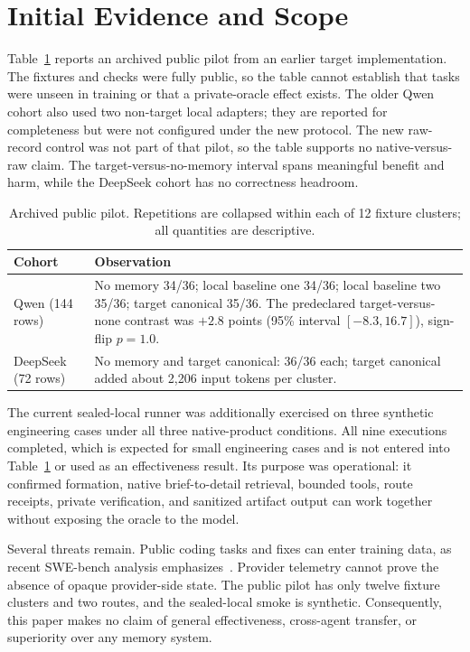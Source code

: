 \documentclass[10pt,conference]{IEEEtran}
\begin{document}
\section{Initial Evidence and Scope}

Table~\ref{tab:pilot} reports an archived public pilot from an earlier target
implementation. The fixtures and checks were fully public, so the table cannot
establish that tasks were unseen in training or that a private-oracle effect
exists. The older Qwen cohort also used two non-target local adapters; they are
reported for completeness but were not configured under the new protocol. The
new raw-record control was not part of that pilot, so the table supports no
native-versus-raw claim. The target-versus-no-memory interval spans meaningful
benefit and harm, while the DeepSeek cohort has no correctness headroom.

\begin{table}[t]
\caption{Archived public pilot. Repetitions are collapsed within each of 12
fixture clusters; all quantities are descriptive.}\label{tab:pilot}
\centering
\small
\begin{tabular}{@{}lp{}@{}}
\toprule
Cohort & Observation \\
\midrule
Qwen (144 rows) & No memory 34/36; local baseline one 34/36; local baseline two 35/36; target canonical 35/36. The predeclared target-versus-none contrast was $+2.8$ points (95\% interval $[-8.3,16.7]$), sign-flip $p=1.0$. \\
DeepSeek (72 rows) & No memory and target canonical: 36/36 each; target canonical added about 2,206 input tokens per cluster. \\
\bottomrule
\end{tabular}
\end{table}

The current sealed-local runner was additionally exercised on three synthetic
engineering cases under all three native-product conditions. All nine executions
completed, which is expected for small engineering cases and is not entered into
Table~\ref{tab:pilot} or used as an effectiveness result. Its purpose was
operational: it confirmed formation, native brief-to-detail retrieval, bounded
tools, route receipts, private verification, and sanitized artifact output can
work together without exposing the oracle to the model.

Several threats remain. Public coding tasks and fixes can enter training data,
as recent SWE-bench analysis emphasizes~\cite{openai2026swebench}. Provider
telemetry cannot prove the absence of opaque provider-side state. The public
pilot has only twelve fixture clusters and two routes, and the sealed-local
smoke is synthetic. Consequently, this paper makes no claim of general
effectiveness, cross-agent transfer, or superiority over any memory system.
\end{document}
